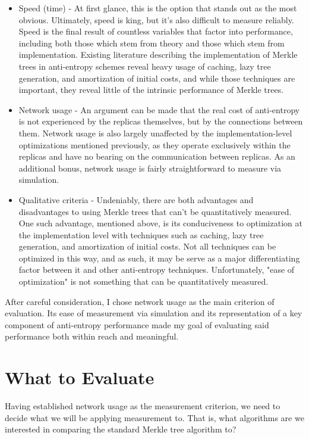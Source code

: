 \documentclass[11pt,letterpaper]{article}
\begin{document}
\begin{itemize}
\item Speed (time) - At first glance, this is the option that stands out as the most obvious. Ultimately, speed is king, but it's also difficult to measure reliably. Speed is the final result of countless variables that factor into performance, including both those which stem from theory and those which stem from implementation. Existing literature describing the implementation of Merkle trees in anti-entropy schemes reveal heavy usage of caching, lazy tree generation, and amortization of initial costs, and while those techniques are important, they reveal little of the intrinsic performance of Merkle trees.

\item Network usage - An argument can be made that the real cost of anti-entropy is not experienced by the replicas themselves, but by the connections between them. Network usage is also largely unaffected by the implementation-level optimizations mentioned previously, as they operate exclusively within the replicas and have no bearing on the communication between replicas. As an additional bonus, network usage is fairly straightforward to measure via simulation.

\item Qualitative criteria - Undeniably, there are both advantages and disadvantages to using Merkle trees that can't be quantitatively measured. One such advantage, mentioned above, is its conduciveness to optimization at the implementation level with techniques such as caching, lazy tree generation, and amortization of initial costs. Not all techniques can be optimized in this way, and as such, it may be serve as a major differentiating factor between it and other anti-entropy techniques. Unfortunately, "ease of optimization" is not something that can be quantitatively measured.
\end{itemize}

After careful consideration, I chose network usage as the main criterion of evaluation. Its ease of measurement via simulation and its representation of a key component of anti-entropy performance made my goal of evaluating said performance both within reach and meaningful.

\section{What to Evaluate}
Having established network usage as the measurement criterion, we need to decide what we will be applying measurement to. That is, what algorithms are we interested in comparing the standard Merkle tree algorithm to?
\end{document}
